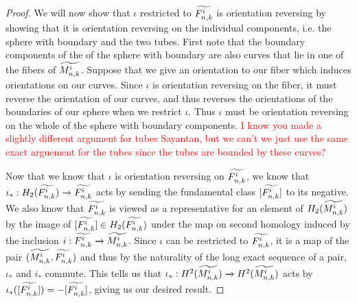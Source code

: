 \begin{proof}
We will now show that $\iota$ restricted to $\widetilde{F^i_{n,k}}$ is orientation reversing by showing that it is orientation reversing on the individual components, i.e. the sphere with boundary and the two tubes. First note that the boundary components of the of the sphere with boundary are also curves that lie in one of the fibers of $\widetilde{M^i_{n,k}}$. Suppose that we give an orientation to our fiber which induces orientations on our curves. Since $\iota$ is orientation reversing on the fiber, it must reverse the orientation of our curves, and thus reverses the orientations of the boundaries of our sphere when we restrict $\iota$. Thus $\iota$ must be orientation reversing on the whole of the sphere with boundary components. \textcolor{red}{I know you made a slightly different argument for tubes Sayantan, but we can't we just use the same exact arguement for the tubes since the tubes are bounded by these curves?}

Now that we know that $\iota$ is orientation reversing on $\widetilde{F^i_{n,k}}$, we know that $\iota_*: H_2(\widetilde{F^i_{n,k}}) \xrightarrow{} \widetilde{F^i_{n,k}}$ acts by sending the fundamental class $[\widetilde{F^i_{n,k}}]$ to its negative. We also know that $\widetilde{F^i_{n,k}}$ is viewed as a representative for an element of $H_2(\widetilde{M^i_{n,k}})$ by the image of $[\widetilde{F^i_{n,k}}] \in H_2(\widetilde{F^i_{n,k}})$ under the map on second homology induced by the inclusion $i: \widetilde{F^i_{n,k}} \xrightarrow[]{} \widetilde{M^i_{n,k}}$. Since $\iota$ can be restricted to $\widetilde{F^i_{n,k}}$, it is a map of the pair $(\widetilde{M^i_{n,k}},\widetilde{F^i_{n,k}})$ and thus by the naturality of the long exact sequence of a pair, $\iota_*$ and $i_*$ commute. This tells us that $\iota_*: H^2(\widetilde{M^i_{n,k}}) \xrightarrow[]{} H^2(\widetilde{M^i_{n,k}})$ acts by $\iota_*([\widetilde{F^i_{n,k}}]) = -[\widetilde{F^i_{n,k}}]$, giving us our desired result.

\end{proof}
